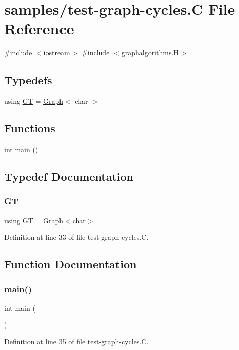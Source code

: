 \hypertarget{test-graph-cycles_8_c}{}\section{samples/test-\/graph-\/cycles.C File Reference}
\label{test-graph-cycles_8_c}
{\ttfamily \#include $<$iostream$>$}\newline
{\ttfamily \#include $<$graphalgorithms.\+H$>$}\newline
\subsection*{Typedefs}
\begin{DoxyCompactItemize}
\item 
using \hyperlink{test-graph-cycles_8_c_a867adda87f9db275997db57644adc40f}{GT} = \hyperlink{class_designar_1_1_graph}{Graph}$<$ char $>$
\end{DoxyCompactItemize}
\subsection*{Functions}
\begin{DoxyCompactItemize}
\item 
int \hyperlink{test-graph-cycles_8_c_ae66f6b31b5ad750f1fe042a706a4e3d4}{main} ()
\end{DoxyCompactItemize}


\subsection{Typedef Documentation}
\mbox{\label{test-graph-cycles_8_c_a867adda87f9db275997db57644adc40f}} 
\subsubsection{\texorpdfstring{GT}{GT}}
{\footnotesize\ttfamily using \hyperlink{demo-buildgraph_8_c_a3001c40d2c31ca87ed96cd7d1334a55e}{GT} =  \hyperlink{class_designar_1_1_graph}{Graph}$<$char$>$}



Definition at line 33 of file test-\/graph-\/cycles.\+C.



\subsection{Function Documentation}
\mbox{\label{test-graph-cycles_8_c_ae66f6b31b5ad750f1fe042a706a4e3d4}} 
\subsubsection{\texorpdfstring{main()}{main()}}
{\footnotesize\ttfamily int main (\begin{DoxyParamCaption}{ }\end{DoxyParamCaption})}



Definition at line 35 of file test-\/graph-\/cycles.\+C.

